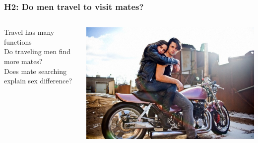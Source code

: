 \documentclass{beamer}
\begin{document}

\begin{frame}
\frametitle{H2: Do men travel to visit mates?}

\begin{columns}
\begin{column}{.6\textwidth}
Travel has many functions \\
\vspace{0.75cm} 
Do traveling men find more mates? \\
\vspace{0.75cm} 
Does mate searching explain sex difference? \\
\vspace{0.75cm} 

\end{column}

\begin{column}{.4\textwidth}
\includegraphics[width= 1\textwidth]{travelmate}
\end{column}

\end{columns}

\end{frame}


\end{document}
